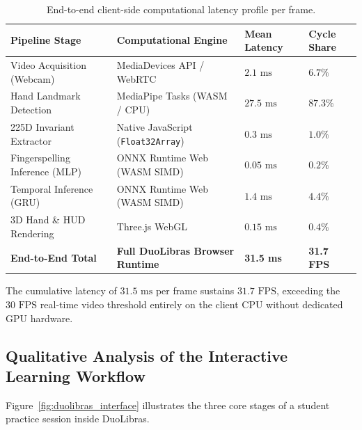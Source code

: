 \documentclass[12pt,a4paper]{article}
\begin{document}
\begin{table}[htbp]
\centering
\caption{End-to-end client-side computational latency profile per frame.}
\label{tab:latency}
\small
\setlength{\tabcolsep}{5pt}
\renewcommand{\arraystretch}{1.25}
\begin{tabularx}{\textwidth}{
    >{\RaggedRight\arraybackslash}p{}
    >{\RaggedRight\arraybackslash}X
    >{\centering\arraybackslash}p{}
    >{\centering\arraybackslash}p{}
}
\toprule
\textbf{Pipeline Stage} & \textbf{Computational Engine} & \textbf{Mean Latency} & \textbf{Cycle Share} \\ \midrule
Video Acquisition (Webcam) & MediaDevices API / WebRTC & $2.1\text{ ms}$ & $6.7\%$ \\
Hand Landmark Detection & MediaPipe Tasks (WASM / CPU) & $27.5\text{ ms}$ & $87.3\%$ \\
225D Invariant Extractor & Native JavaScript (\texttt{Float32Array}) & $0.3\text{ ms}$ & $1.0\%$ \\
Fingerspelling Inference (MLP) & ONNX Runtime Web (WASM SIMD) & $0.05\text{ ms}$ & $0.2\%$ \\
Temporal Inference (GRU) & ONNX Runtime Web (WASM SIMD) & $1.4\text{ ms}$ & $4.4\%$ \\
3D Hand \& HUD Rendering & Three.js WebGL & $0.15\text{ ms}$ & $0.4\%$ \\ \midrule
\textbf{End-to-End Total} & \textbf{Full DuoLibras Browser Runtime} & \textbf{31.5 ms} & \textbf{31.7 FPS} \\
\bottomrule
\end{tabularx}
\end{table}

The cumulative latency of $31.5\text{ ms}$ per frame sustains $31.7\text{ FPS}$, exceeding the $30\text{ FPS}$ real-time video threshold entirely on the client CPU without dedicated GPU hardware.

\subsection{Qualitative Analysis of the Interactive Learning Workflow}

Figure~\ref{fig:duolibras_interface} illustrates the three core stages of a student practice session inside DuoLibras.
\end{document}
